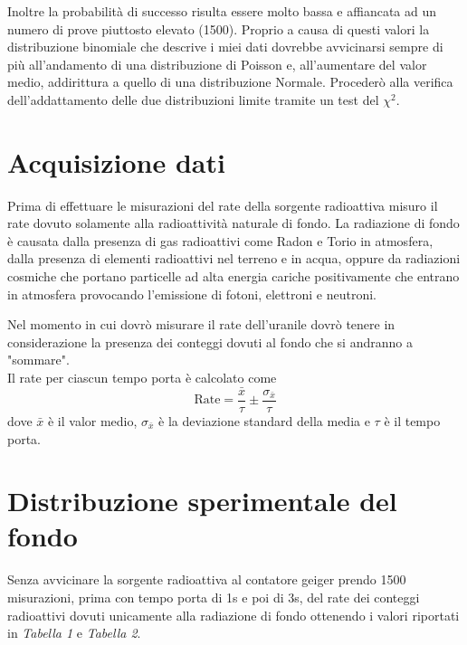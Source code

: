 \documentclass{article}
\begin{document}
Inoltre la probabilità di successo risulta essere molto bassa e affiancata ad un numero di prove piuttosto elevato (1500). Proprio a causa di questi valori la distribuzione binomiale che descrive i miei dati dovrebbe avvicinarsi sempre di più all'andamento di una distribuzione di Poisson e, all'aumentare del valor medio, addirittura a quello di una distribuzione Normale. Procederò alla verifica dell'addattamento delle due distribuzioni limite tramite un test del $\chi^2$.

\section{Acquisizione dati}
Prima di effettuare le misurazioni del rate della sorgente radioattiva misuro il rate dovuto solamente alla radioattività naturale di fondo. La radiazione di fondo è causata dalla presenza di gas radioattivi come Radon e Torio in atmosfera, dalla presenza di elementi radioattivi nel terreno e in acqua, oppure da radiazioni cosmiche che portano  particelle ad alta energia cariche positivamente che entrano in atmosfera provocando l'emissione di fotoni, elettroni e neutroni. 

Nel momento in cui dovrò misurare il rate dell'uranile dovrò tenere in considerazione la presenza dei conteggi dovuti al fondo che si andranno a "sommare". \\

\noindent
Il rate per ciascun tempo porta è calcolato come
\[
	\text{Rate} = \frac{\bar{x}}{\tau} \pm \frac{\sigma_{\bar{x}}}{\tau}
\]
dove $\bar{x}$ è il valor medio, $\sigma_{\bar{x}}$ è la deviazione standard della media e $\tau$ è il tempo porta.

\section{Distribuzione sperimentale del fondo}
Senza avvicinare la sorgente radioattiva al contatore geiger prendo 1500 misurazioni, prima con tempo porta di 1s e poi di 3s, del rate dei conteggi radioattivi dovuti unicamente alla radiazione di fondo ottenendo i valori riportati in \textit{Tabella 1} e \textit{Tabella 2}. 
\end{document}
